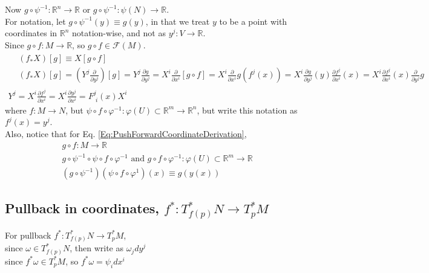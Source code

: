 \documentclass[10pt]{amsart}
\begin{document}
\begin{multicols*}{2}
Now $g\circ \psi^{-1} : \mathbb{R}^n \to \mathbb{R}$ or $g \circ \psi^{-1} : \psi(N) \to \mathbb{R}$. \\

For notation, let $g\circ \psi^{-1} (y) \equiv g(y)$, in that we treat $y$ to be a point with coordinates in $\mathbb{R}^n$ notation-wise, and not as $y^j : V \to \mathbb{R}$. \\

Since $g\circ f: M \to \mathbb{R}$, so $g\circ f \in \mathcal{F}(M)$.
\begin{equation}\label{Eq:PushForwardCoordinateDerivation}
\begin{gathered}
\begin{aligned}
& (f_* X)[g] \equiv X[g \circ f] \\
& (f_* X)[g] = (Y^j \frac{\partial}{\partial y^j})[g] = Y^j \frac{\partial g}{ \partial y^j} = X^i \frac{\partial}{\partial x^i} [g \circ f] = X^i \frac{\partial}{\partial x^i} g(f^j(x)) = X^i \frac{\partial g}{ \partial y^j}(y) \frac{\partial f^j}{ \partial x^i}(x) = X^i \frac{\partial f^j}{ \partial x^i}(x) \frac{\partial}{\partial y^j} g
\end{aligned} \\
Y^j = X^i \frac{ \partial f^j}{\partial x^i} = X^i \frac{ \partial y^j}{\partial x^i} = F^j_{\, \, i}(x)X^i
\end{gathered}
\end{equation}
where $f:M \to N$, but $\psi \circ f \circ \varphi^{-1} : \varphi(U) \subset \mathbb{R}^m \to \mathbb{R}^n$, but write this notation as $f^j(x) = y^j$. \\

Also, notice that for Eq. \ref{Eq:PushForwardCoordinateDerivation},
\[
\begin{gathered}
	g\circ f: M \to \mathbb{R} \\
	g\circ \psi^{-1} \circ \psi \circ f \circ \varphi^{-1} \text{ and } g\circ f \circ \varphi^{-1} : \varphi(U) \subset \mathbb{R}^m \to \mathbb{R} \\
	(g\circ \psi^{-1}) (\psi \circ f \circ \varphi^{1}) (x) \equiv g(y(x))
\end{gathered}
\]

\subsection{Pullback in coordinates, $f^* : T^*_{f(p)}N \to T^*_pM$ } 

For pullback $f^* : T^*_{f(p)}N \to T^*_pM$, \\
since $\omega \in T^*_{f(p)}N$, then write as $\omega_j dy^j$ \\
since $f^*\omega \in T^*_pM$, so $f^* \omega = \psi_i dx^i$ 


\end{multicols*}
\end{document}
